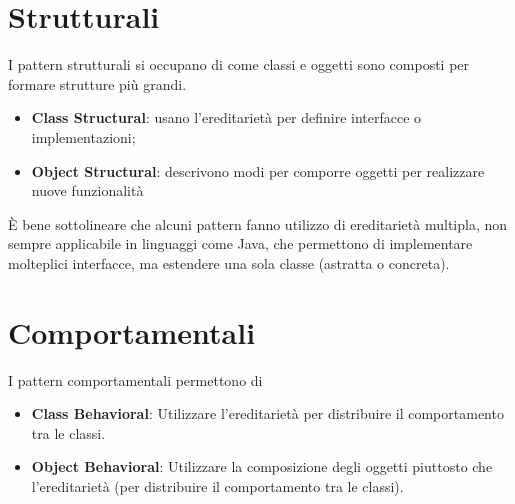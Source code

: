 \section{Strutturali}

I pattern strutturali si occupano di come classi e oggetti sono composti per formare strutture più grandi. 
\begin{itemize}
    \item \textbf{Class Structural}: usano l'ereditarietà per definire interfacce o implementazioni;
    \item \textbf{Object Structural}: descrivono modi per comporre oggetti per realizzare nuove funzionalità
\end{itemize}

È bene sottolineare che alcuni pattern fanno utilizzo di ereditarietà multipla, non sempre applicabile in linguaggi come Java, che permettono di implementare molteplici interfacce, ma estendere una sola classe (astratta o concreta).









\section{Comportamentali}

I pattern comportamentali permettono di 
\begin{itemize}
    \item \textbf{Class Behavioral}: Utilizzare l'ereditarietà per distribuire il comportamento tra le classi.
    \item \textbf{Object Behavioral}: Utilizzare la composizione degli oggetti piuttosto che l'ereditarietà (per distribuire il comportamento tra le classi).
\end{itemize}












